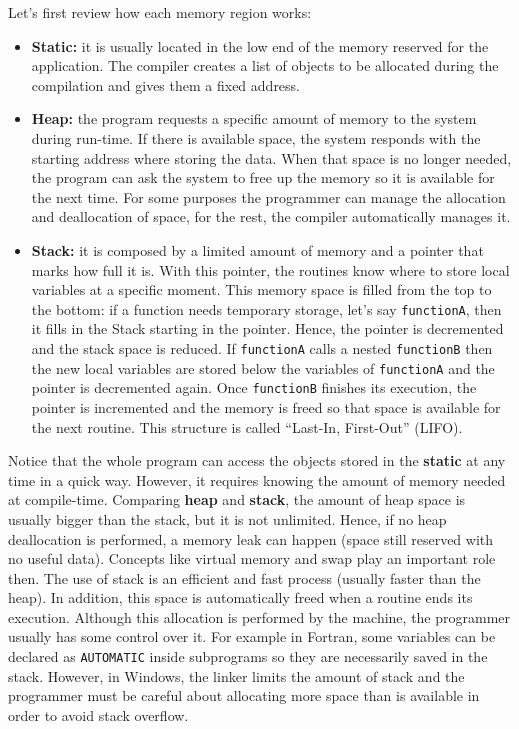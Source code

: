 Let's first review how each memory region works:
\begin{itemize}
    \item \textbf{Static:} it is usually located in the low end of the memory reserved for the application. 
    The compiler creates a list of objects to be allocated during the compilation and gives them a fixed address.
       
    \item \textbf{Heap:} the program requests a specific amount of memory to the system during run-time.
    If there is available space, the system responds with the starting address where storing the data. 
    When that space is no longer needed, the program can ask the system to free up the memory so it is available for the next time.
    For some purposes the programmer can manage the allocation and deallocation of space, for the rest, the compiler automatically manages it. 
   
    \item \textbf{Stack:} it is composed by a limited amount of memory and a pointer that marks how full it is. 
    With this pointer, the routines know where to store local variables at a specific moment. 
    This memory space is filled from the top to the bottom: 
    if a function needs temporary storage, let's say \texttt{functionA}, then it fills in the Stack starting in the pointer.
    Hence, the pointer is decremented and the stack space is reduced. 
    If \texttt{functionA} calls a nested \texttt{functionB} then the new local variables are stored below the variables of \texttt{functionA} and the pointer is decremented again. 
    Once \texttt{functionB} finishes its execution, the pointer is incremented and the memory is freed so that space is available for the next routine. 
    This structure is called ``Last-In, First-Out'' (LIFO).  
\end{itemize}

Notice that the whole program can access the objects stored in the \textbf{static} at any time in a quick way.
However, it requires knowing the amount of memory needed at compile-time.
Comparing \textbf{heap} and \textbf{stack}, the amount of heap space is usually bigger than the stack, but it is not unlimited. 
Hence, if no heap deallocation is performed, a memory leak can happen (space still reserved with no useful data).
Concepts like virtual memory and swap play an important role then. 
The use of stack is an efficient and fast process (usually faster than the heap).
In addition, this space is automatically freed when a routine ends its execution. 
Although this allocation is performed by the machine,
the programmer usually has some control over it. 
For example in Fortran, some variables can be declared as \texttt{AUTOMATIC} inside subprograms so they are necessarily saved in the stack. 
However, in Windows, the linker limits the amount of stack and the programmer must be careful about allocating more space than is available in order to avoid stack overflow.   

